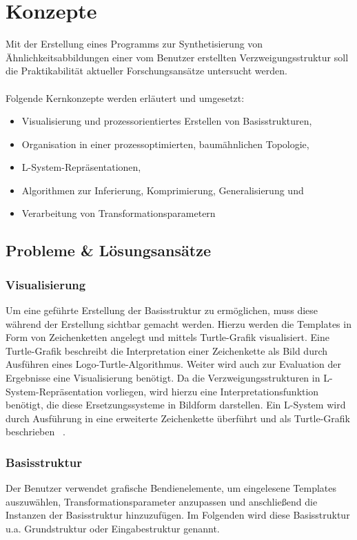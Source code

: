
\chapter{Konzepte}
Mit der Erstellung eines Programms zur Synthetisierung von Ähnlichkeitsabbildungen einer vom Benutzer
erstellten Verzweigungsstruktur soll die Praktikabilität aktueller Forschungsansätze untersucht werden.
\\~\\
Folgende Kernkonzepte werden erläutert und umgesetzt:
\begin{itemize}
    \item Visualisierung und prozessorientiertes Erstellen von Basisstrukturen,
    \item Organisation in einer prozessoptimierten, baumähnlichen Topologie,
    \item L-System-Repräsentationen,
    \item Algorithmen zur Inferierung, Komprimierung, Generalisierung und
    \item Verarbeitung von Transformationsparametern
\end{itemize}

\section{Probleme \& Lösungsansätze}
\label{probleme}

\subsection*{Visualisierung}
Um eine geführte Erstellung der Basisstruktur zu ermöglichen, muss diese während der Erstellung sichtbar gemacht werden.
Hierzu werden die Templates in Form von Zeichenketten angelegt und mittels Turtle-Grafik visualisiert.
Eine Turtle-Grafik beschreibt die Interpretation einer Zeichenkette als Bild durch Ausführen eines Logo-Turtle-Algorithmus.
Weiter wird auch zur Evaluation der Ergebnisse eine Visualisierung benötigt.
Da die Verzweigungsstrukturen in L-System-Repräsentation vorliegen, wird hierzu eine Interpretationsfunktion benötigt,
die diese Ersetzungssysteme in Bildform darstellen.
Ein L-System wird durch Ausführung in eine erweiterte Zeichenkette überführt und als Turtle-Grafik beschrieben
~\cite{prusinkiewicz_1986}.

\subsection*{Basisstruktur}
Der Benutzer verwendet grafische Bendienelemente, um eingelesene Templates auszuwählen, Transformationsparameter anzupassen
und anschließend die Instanzen der Basisstruktur hinzuzufügen.
Im Folgenden wird diese Basisstruktur u.a. Grundstruktur oder Eingabestruktur genannt.

